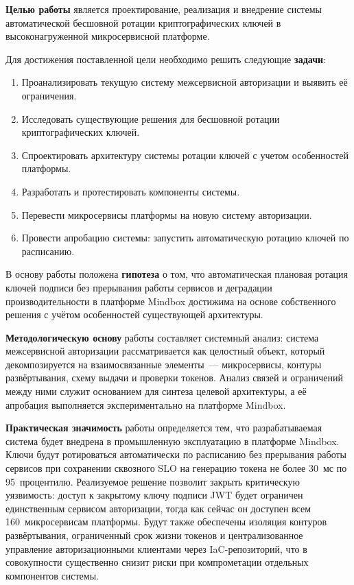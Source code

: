 \textbf{Целью работы} является проектирование, реализация и внедрение системы автоматической бесшовной
ротации криптографических ключей в высоконагруженной микросервисной платформе.

Для достижения поставленной цели необходимо решить следующие \textbf{задачи}:
\begin{enumerate}
  \item Проанализировать текущую систему межсервисной авторизации и выявить её ограничения.
  \item Исследовать существующие решения для бесшовной ротации криптографических ключей.
  \item Спроектировать архитектуру системы ротации ключей с учетом особенностей платформы.
  \item Разработать и протестировать компоненты системы.
  \item Перевести микросервисы платформы на новую систему авторизации.
  \item Провести апробацию системы: запустить автоматическую ротацию ключей по расписанию.
\end{enumerate}

В основу работы положена \textbf{гипотеза} о том, что автоматическая плановая ротация
ключей подписи без прерывания работы сервисов и деградации производительности
в платформе Mindbox достижима на основе собственного решения с учётом особенностей существующей архитектуры.

\textbf{Методологическую основу} работы составляет системный анализ: система межсервисной
авторизации рассматривается как целостный объект, который декомпозируется на взаимосвязанные
элементы~--- микросервисы, контуры развёртывания, схему выдачи и проверки токенов.
Анализ связей и ограничений между ними служит основанием для синтеза целевой архитектуры,
а её апробация выполняется экспериментально на платформе Mindbox.

\textbf{Практическая значимость} работы определяется тем, что разрабатываемая система
будет внедрена в промышленную эксплуатацию в платформе Mindbox.
Ключи будут ротироваться автоматически по расписанию без прерывания работы сервисов
при сохранении сквозного SLO на генерацию токена не более 30~мс по 95~процентилю.
Реализуемое решение позволит закрыть критическую уязвимость: доступ к закрытому ключу подписи JWT
будет ограничен единственным сервисом авторизации, тогда как сейчас он доступен всем 160~микросервисам платформы.
Будут также обеспечены изоляция контуров развёртывания, ограниченный срок жизни токенов и централизованное управление
авторизационными клиентами через IaC-репозиторий,
что в совокупности существенно снизит риски при компрометации отдельных компонентов системы.
